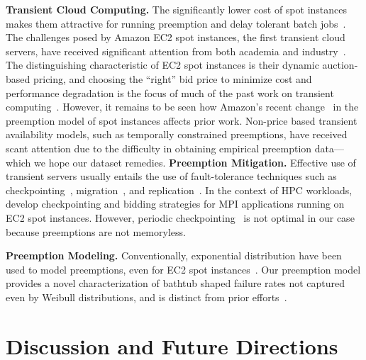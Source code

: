 \documentclass[sigconf]{acmart} %
\newcommand{\subsecspace}[0]{-0.20cm}
\begin{document}
\noindent \textbf{Transient Cloud Computing.}
The significantly lower cost of spot instances makes them attractive for running preemption and delay tolerant batch jobs~\cite{spoton, jain14demand, yi2010reducing, conductor, liu-spot, spot-run, dubois2016optispot, varshney_autobot_2019, harlap2018tributary}. 
The challenges posed by Amazon EC2 spot instances, the first transient cloud servers, have received significant attention from both academia  and industry~\cite{spotinst}. 
The distinguishing characteristic of EC2 spot instances is their dynamic auction-based pricing, and choosing the ``right'' bid price to minimize cost and performance degradation is the focus of much of the past work on transient computing~\cite{bidding4,mihailescu2012impact,bidding7,bidding1,bidding8,bidding3,bidding6,bid-cloud,bidding5,wolski_probabilistic_2017, guo_bidding_2015}.
However, it remains to be seen how Amazon's recent change~\cite{bid-change, irwin-icccn19, baughman2019deconstructing, pham2018performance} in the preemption model of spot instances affects prior work. 
Non-price based transient availability models, such as temporally constrained preemptions, have received scant attention due to the difficulty in obtaining empirical preemption data---which we hope our dataset remedies. 
\noindent \textbf{Preemption Mitigation.}
Effective use of transient servers usually entails the use of fault-tolerance techniques such as checkpointing~\cite{flint}, migration~\cite{spotcheck}, and replication~\cite{spoton}. 
In the context of HPC workloads,~\cite{marathe2014exploiting,gong_monetary_2015,xiang_spotmpi:_2011} develop checkpointing and bidding strategies for MPI applications running on EC2 spot instances.
However, periodic checkpointing~\cite{dongarra_fault_nodate, bougeret_checkpointing_2011} is not optimal in our case because preemptions are not memoryless. 

\noindent \textbf{Preemption Modeling.}
Conventionally, exponential distribution have been used to model preemptions, even for EC2 spot instances~\cite{bid-cloud, flint, hotcloud-not-bid}. 
Our preemption model provides a novel characterization of bathtub shaped failure rates not captured even by Weibull distributions, and is distinct from prior efforts~\cite{mudholkar1993exponentiated, crevecoeur1993model}. 

\vspace*{\subsecspace}
\section{Discussion and Future Directions}
\label{sec:discussion}
\end{document}
